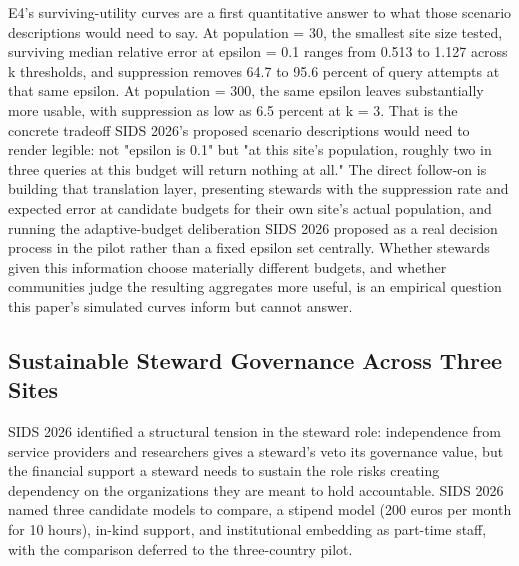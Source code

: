 E4's surviving-utility curves are a first quantitative answer to what those scenario descriptions would need to say. At population = 30, the smallest site size tested, surviving median relative error at epsilon = 0.1 ranges from 0.513 to 1.127 across k thresholds, and suppression removes 64.7 to 95.6 percent of query attempts at that same epsilon. At population = 300, the same epsilon leaves substantially more usable, with suppression as low as 6.5 percent at k = 3. That is the concrete tradeoff SIDS 2026's proposed scenario descriptions would need to render legible: not "epsilon is 0.1" but "at this site's population, roughly two in three queries at this budget will return nothing at all." The direct follow-on is building that translation layer, presenting stewards with the suppression rate and expected error at candidate budgets for their own site's actual population, and running the adaptive-budget deliberation SIDS 2026 proposed as a real decision process in the pilot rather than a fixed epsilon set centrally. Whether stewards given this information choose materially different budgets, and whether communities judge the resulting aggregates more useful, is an empirical question this paper's simulated curves inform but cannot answer.

\subsection{Sustainable Steward Governance Across Three Sites}

SIDS 2026 identified a structural tension in the steward role: independence from service providers and researchers gives a steward's veto its governance value, but the financial support a steward needs to sustain the role risks creating dependency on the organizations they are meant to hold accountable. SIDS 2026 named three candidate models to compare, a stipend model (200 euros per month for 10 hours), in-kind support, and institutional embedding as part-time staff, with the comparison deferred to the three-country pilot.

